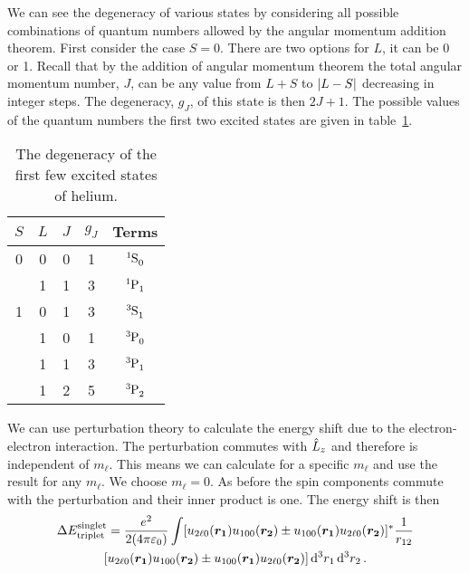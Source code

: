     We can see the degeneracy of various states by considering all possible combinations of quantum numbers allowed by the angular momentum addition theorem.
    First consider the case \(S = 0\).
    There are two options for \(L\), it can be 0 or 1.
    Recall that by the addition of angular momentum theorem the total angular momentum number, \(J\), can be any value from \(L + S\) to \(\abs{L - S}\) decreasing in integer steps.
    The degeneracy, \(g_J\), of this state is then \(2J + 1\).
    The possible values of the quantum numbers the first two excited states are given in table~\ref{tab:degeneracy of helium excited states}.
    \begin{table}[ht]
        \centering
        \begin{tabular}{c|ccc|c}
            \hline
            \(S\) & \(L\) & \(J\) & \(g_J\) &           Terms           \\ \hline
              0   &   0   &   0   &    1    & \(\termNotation{1}{S}{0}\)\\
                  &   1   &   1   &    3    & \(\termNotation{1}{P}{1}\)\\ \hline
              1   &   0   &   1   &    3    & \(\termNotation{3}{S}{1}\)\\
                  &   1   &   0   &    1    & \(\termNotation{3}{P}{0}\)\\
                  &   1   &   1   &    3    & \(\termNotation{3}{P}{1}\)\\
                  &   1   &   2   &    5    & \(\termNotation{3}{P}{2}\)\\ \hline
        \end{tabular}
        \caption{The degeneracy of the first few excited states of helium.}
        \label{tab:degeneracy of helium excited states}
    \end{table}
    We can use perturbation theory to calculate the energy shift due to the electron-electron interaction.
    The perturbation commutes with \(\hat{L}_z\) and therefore is independent of \(m_\ell\).
    This means we can calculate for a specific \(m_\ell\) and use the result for any \(m_\ell\).
    We choose \(m_\ell = 0\).
    As before the spin components commute with the perturbation and their inner product is one.
    The energy shift is then
    \begin{multline*}
        \Delta E_{\text{triplet}}^{\text{singlet}} = \frac{e^2}{2(4\pi\varepsilon_0)} \int [u_{2\ell0}(\vv{r_1})u_{100}(\vv{r_2}) \pm u_{100}(\vv{r_1})u_{2\ell0}(\vv{r_2})]^* \frac{1}{r_{12}}\\ [u_{2\ell0}(\vv{r_1})u_{100}(\vv{r_2}) \pm u_{100}(\vv{r_1})u_{2\ell0}(\vv{r_2})] \dd[3]{r_1}\dd[3]{r_2}.
    \end{multline*}
